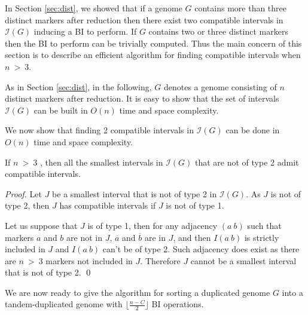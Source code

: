 \documentclass{llncs}
\newcommand{\snd}[1]{ \ensuremath{\overline{#1}} }
\begin{document}
In Section \ref{sec:dist}, we showed that if a genome $G$ contains more than 
three distinct markers after reduction then there exist two compatible 
intervals in $\mathcal{I}(G)$ inducing a BI to perform.
If $G$ contains two or three distinct markers then the BI to perform can be 
trivially computed.
Thus the main concern of this section is to describe an efficient algorithm 
for finding compatible intervals when $n~>~3$.


As in Section \ref{sec:dist}, in the following, $G$ denotes a genome consisting 
of $n$ distinct markers after reduction. 
It is easy to show that the set of intervals 
$\mathcal{I}(G)$ can be built in $O(n)$ time and space complexity.




We now show that finding 2 compatible intervals in  $\mathcal{I}(G)$ can be done in $O(n)$ time and space complexity.


\begin{property}
If $n~>~3$ , then all the smallest intervals in $\mathcal{I}(G)$ that are not of type 2 admit compatible intervals.
\label{smallestOK}
\end{property}

\begin{proof}











    Let $J$ be a smallest interval that is not of type 2 in
    $\mathcal{I}(G)$. As $J$ is not of type 2, then $J$ has compatible
    intervals if $J$ is not of type 1.

Let us suppose that $J$ is of type 1, then for any adjacency $(a ~ b)$ such 
that markers $a$ and $b$ are not in $J$,  $\snd{a}$ and $\snd{b}$ are in $J$, 
and then $I(a ~ b)$ is strictly included in $J$ and $I(a ~ b)$ can't be of 
type 2. Such adjacency does exist as there are $n~>~3$ markers not included in $J$.
Therefore $J$ cannot be a smallest interval that is not of type 2.
\qed
\end{proof}











We are now ready to give the algorithm for sorting a duplicated genome $G$ into a tandem-duplicated genome with $\lfloor \frac{n - C}{2} \rfloor$ BI operations.
\end{document}

